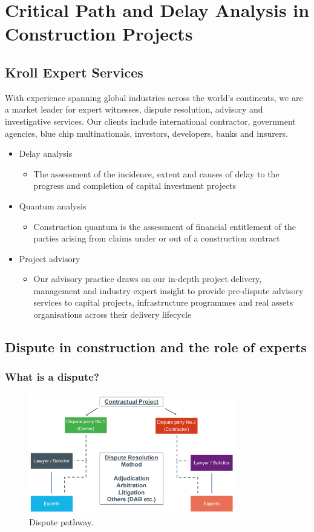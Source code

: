 \chapter{Critical Path and Delay Analysis in Construction Projects}
\section{Kroll Expert Services}
With experience spanning global industries across the world's continents, we are a market leader for expert witnesses, dispute resolution, advisory and investigative services. Our clients include international contractor, government agencies, blue chip multinationals, investors, developers, banks and insurers.
\begin{itemize}
    \item Delay analysis
          \begin{itemize}
              \item The assessment of the incidence, extent and causes of delay to the progress and completion of capital investment projects
          \end{itemize}
    \item Quantum analysis
          \begin{itemize}
              \item Construction quantum is the assessment of financial entitlement of the parties arising from claims under or out of a construction contract
          \end{itemize}
    \item Project advisory
          \begin{itemize}
              \item Our advisory practice draws on our in-depth project delivery, management and industry expert insight to provide pre-dispute advisory services to capital projects, infrastructure programmes and real assets organisations across their delivery lifecycle
          \end{itemize}
\end{itemize}
\section{Dispute in construction and the role of experts}
\subsection{What is a dispute?}
\begin{figure}[H]
    \centering
    \includegraphics[width = 0.8\textwidth]{img/figure27.png}
    \caption{Dispute pathway.}
\end{figure}
